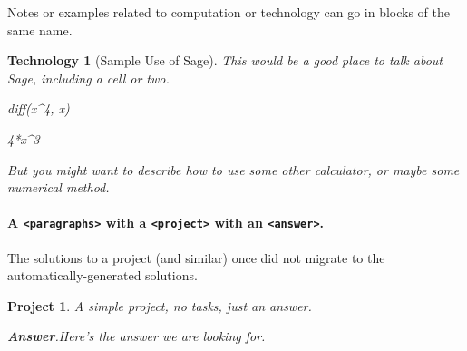 \documentclass{sn-jnl}
\theoremstyle{thmstyleone}%
\theoremstyle{thmstyletwo}%
\newtheorem{project}[theorem]{Project}
\theoremstyle{thmstylethree}%
\newtheorem{technology}[theorem]{Technology}
\newcommand{\blocktitlefont}{\relax}
\newcommand{\xreffont}{\relax}
\newcommand{\mono}[1]{\texttt{#1}}
\numberwithin{equation}{section}
\begin{document}
Notes or examples related to computation or technology can go in blocks of the same name.%
\begin{technology}[Sample Use of Sage]\label{section-interesting-corollary-5-3-19}%
%
This would be a good place to talk about Sage, including a cell or two.%
\begin{sageinput}
diff(x^4, x)
\end{sageinput}
\begin{sageoutput}
4*x^3
\end{sageoutput}
But you might want to describe how to use some other calculator, or maybe some numerical method.%
\end{technology}
\paragraph*{A \mono{<paragraphs>} with a \mono{<project>} with an \mono{<answer>}.}\label{section-interesting-corollary-5-3-20}%
The solutions to a project (and similar) once did not migrate to the automatically-generated solutions.%
\begin{project}\label{section-interesting-corollary-5-3-20-3}%
%
A simple project, no tasks, just an answer.%
\par\smallskip%
\noindent\textbf{\blocktitlefont Answer}.\hypertarget{section-interesting-corollary-5-3-20-3-2}{}\quad{}Here's the answer we are looking for.%
\end{project}%
%
%
\typeout{************************************************}
\typeout{************************************************}
%
\end{document}
